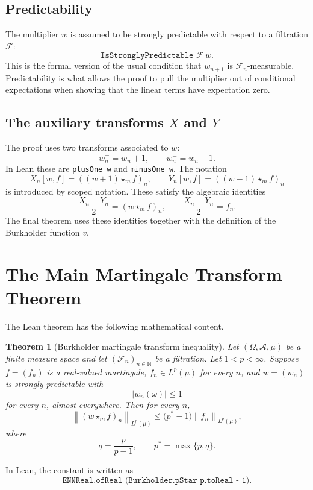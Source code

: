 \documentclass[11pt]{amsart}
\newcommand{\N}{\mathbb{N}}
\newcommand{\F}{\mathcal{F}}
\newcommand{\norm}[1]{\left\lVert #1 \right\rVert}
\newtheorem{theorem}{Theorem}
\begin{document}
\subsection{Predictability}

The multiplier \(w\) is assumed to be strongly predictable with respect to a
filtration \(\F\):
\[
  \texttt{IsStronglyPredictable }\F\,w.
\]
This is the formal version of the usual condition that \(w_{n+1}\) is
\(\F_n\)-measurable.  Predictability is what allows the proof to pull the
multiplier out of conditional expectations when showing that the linear terms
have expectation zero.

\subsection{The auxiliary transforms \(X\) and \(Y\)}

The proof uses two transforms associated to \(w\):
\[
  w^+_n = w_n + 1,\qquad w^-_n = w_n - 1.
\]
In Lean these are \texttt{plusOne w} and \texttt{minusOne w}.  The notation
\[
  X_n[w,f] = ((w+1)\star_m f)_n,\qquad
  Y_n[w,f] = ((w-1)\star_m f)_n
\]
is introduced by scoped notation.  These satisfy the algebraic identities
\[
  \frac{X_n+Y_n}{2} = (w\star_m f)_n,
  \qquad
  \frac{X_n-Y_n}{2} = f_n.
\]
The final theorem uses these identities together with the definition of the
Burkholder function \(v\).

\section{The Main Martingale Transform Theorem}

The Lean theorem has the following mathematical content.

\begin{theorem}[Burkholder martingale transform inequality]
Let \((\Omega,\mathcal{A},\mu)\) be a finite measure space and let
\((\F_n)_{n\in\N}\) be a filtration.  Let \(1 < p < \infty\).  Suppose
\(f = (f_n)\) is a real-valued martingale, \(f_n \in L^p(\mu)\) for every
\(n\), and \(w = (w_n)\) is strongly predictable with
\[
  |w_n(\omega)| \le 1
\]
for every \(n\), almost everywhere.  Then for every \(n\),
\[
  \norm{(w\star_m f)_n}_{L^p(\mu)}
    \le \bigl(p^\ast-1\bigr)\norm{f_n}_{L^p(\mu)},
\]
where
\[
  q = \frac{p}{p-1},
  \qquad
  p^\ast = \max\{p,q\}.
\]
\end{theorem}

In Lean, the constant is written as
\[
  \texttt{ENNReal.ofReal (Burkholder.pStar p.toReal - 1)}.
\]
\end{document}
